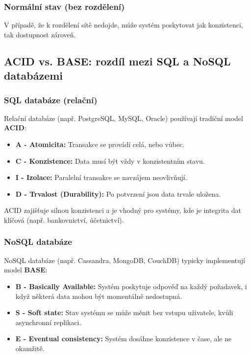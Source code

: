 \subsubsection*{Normální stav (bez rozdělení)}

V případě, že k rozdělení sítě nedojde, může systém poskytovat jak konzistenci, tak dostupnost zároveň.

\subsection*{ACID vs. BASE: rozdíl mezi SQL a NoSQL databázemi}

\subsubsection*{SQL databáze (relační)}

Relační databáze (např. PostgreSQL, MySQL, Oracle) používají tradiční model \textbf{ACID}:

\begin{itemize}
    \item \textbf{A - Atomicita:} Transakce se provádí celá, nebo vůbec.
    \item \textbf{C - Konzistence:} Data musí být vždy v konzistentním stavu.
    \item \textbf{I - Izolace:} Paralelní transakce se navzájem neovlivňují.
    \item \textbf{D - Trvalost (Durability):} Po potvrzení jsou data trvale uložena.
\end{itemize}

ACID zajišťuje silnou konzistenci a je vhodný pro systémy, kde je integrita dat klíčová (např. bankovnictví, účetnictví).

\subsubsection*{NoSQL databáze}

NoSQL databáze (např. Cassandra, MongoDB, CouchDB) typicky implementují model \textbf{BASE}:

\begin{itemize}
    \item \textbf{B - Basically Available:} Systém poskytuje odpověď na každý požadavek, i když některá data mohou být momentálně nedostupná.
    \item \textbf{S - Soft state:} Stav systému se může měnit bez vstupu uživatele, kvůli asynchronní replikaci.
    \item \textbf{E - Eventual consistency:} Systém dosáhne konzistence v čase, ale ne okamžitě.
\end{itemize}

